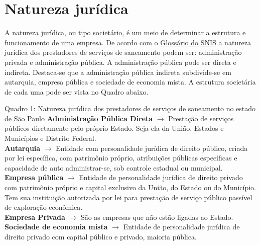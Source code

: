 

\section{Natureza jurídica}\label{s:natur}

\begin{multicols}{2}

A natureza jurídica, ou tipo societário, é um meio de determinar a estrutura e funcionamento de uma empresa. De acordo com o \href{http://www.snis.gov.br/downloads/manuais-atualizados/drenagem/Natureza_Juridica.pdf}{Glossário do SNIS} a natureza jurídica dos prestadores de serviços de saneamento podem ser: administração privada e administração pública. A administração pública pode ser direta e indireta. Destaca-se que a administração pública indireta subdivide-se em autarquia, empresa pública e sociedade de economia mista. A estrutura societária de cada uma pode ser vista no Quadro abaixo.

\end{multicols}

\vspace{1cm}


\begin{myexampleblock}{Quadro 1: Natureza jurídica dos prestadores de serviços de saneamento no estado de São Paulo}\label{qua:q1}
   \textbf{Administração Pública Direta} $\rightarrow$ Prestação de serviços
públicos diretamente pelo próprio Estado. Seja ela da União, Estados e Municípios e Distrito Federal. \\
   
  \textbf{Autarquia}  $\rightarrow$ Entidade com personalidade jurídica de direito público, criada por lei específica, com patrimônio próprio, atribuições públicas
específicas e capacidade de auto administrar-se, sob controle estadual ou municipal. \\

  \textbf{Empresa pública} $\rightarrow$ Entidade de personalidade jurídica de direito privado com patrimônio próprio e capital exclusivo da União, do Estado ou do
Município. Tem sua instituição autorizada por lei para prestação de serviço público passível de exploração econômica. \\

  \textbf{Empresa Privada} $\rightarrow$ São as empresas que não estão ligadas ao Estado. \\

  \textbf{Sociedade de economia mista} $\rightarrow$ Entidade de personalidade jurídica de direito privado com capital público e privado, maioria pública. 
\end{myexampleblock} 

